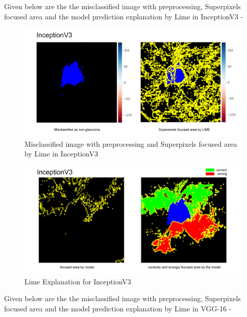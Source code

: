 \newpage
\vspace{5mm}
Given below are the the misclassified image with preprocessing, Superpixels focused area and the model prediction explanation by Lime in InceptionV3 -

\vspace{5mm}
\begin{figure}[hbt!]
\centering
\includegraphics[scale=0.5]{images/fig-44.png}
\caption{Misclassified image with preprocessing and Superpixels focused area by Lime in InceptionV3
}
\label{fig:x Misclassified image with preprocessing and Superpixels focused area by Lime in InceptionV3
}
\end{figure}

\vspace{5mm}
\begin{figure}[hbt!]
\centering
\includegraphics[scale=0.5]{images/fig-45.png}
\caption{Lime Explanation for InceptionV3}
\label{fig:x Lime Explanation for InceptionV3}
\end{figure}

\newpage
\vspace{5mm}
Given below are the the misclassified image with preprocessing, Superpixels focused area and the model prediction explanation by Lime in VGG-16 -

